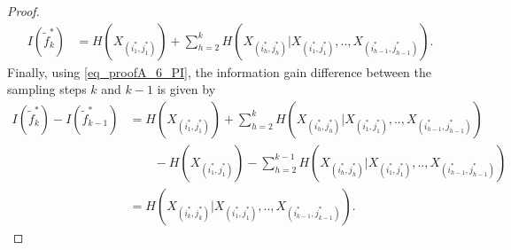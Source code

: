 \begin{proof}
\begin{align}
	I(\tilde{f}^*_k) &= H( {X}_{(i_{1}^{*},j_{1}^{*})} ) + \sum_{h = 2}^{k} H(  {X}_{(i_{h}^{*},j_{h}^{*})} |  {X}_{(i_{1}^{*},j_{1}^{*})} , .. ,  {X}_{(i_{h -1}^{*},j_{h -1}^{*})}   ). 
\end{align}
Finally, using \eqref{eq_proofA_6_PI}, the information gain difference between the sampling steps $k$ and $k-1$ is given by
\begin{align}\label{eq_proofA_7_PI}
	I(\tilde{f}^*_k) - I(\tilde{f}^*_{k-1}) &= H( {X}_{(i_{1}^{*},j_{1}^{*})} ) + \sum_{h = 2}^{k} H(  {X}_{(i_{h}^{*},j_{h}^{*})} |  {X}_{(i_{1}^{*},j_{1}^{*})} , .. ,  {X}_{(i_{h -1}^{*},j_{h -1}^{*})}   )  \nonumber \\ & \qquad - H( {X}_{(i_{1}^{*},j_{1}^{*})} ) - \sum_{h = 2}^{k-1} H(  {X}_{(i_{h}^{*},j_{h}^{*})} |  {X}_{(i_{1}^{*},j_{1}^{*})} , .. ,  {X}_{(i_{h -1}^{*},j_{h -1}^{*})}   ) \nonumber \\
	&= H(  {X}_{(i_{k}^{*},j_{k}^{*})} |  {X}_{(i_{1}^{*},j_{1}^{*})}, .., {X}_{(i_{k-1}^{*},j_{k-1}^{*})} ).
\end{align}

\end{proof}


